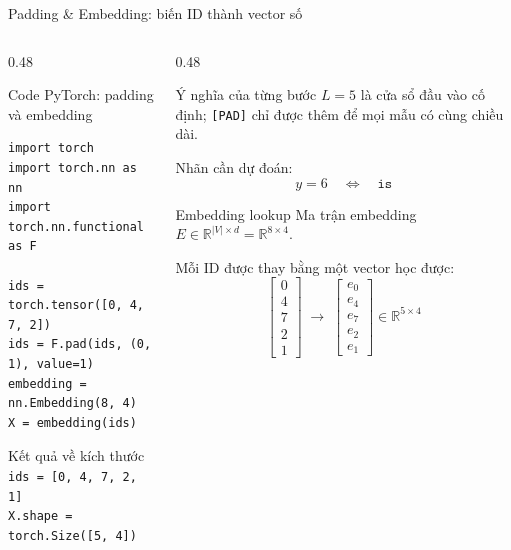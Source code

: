\documentclass[aspectratio=169, 10pt]{beamer}
\begin{document}
\begin{frame}[fragile]{Padding \& Embedding: biến ID thành vector số}
\begin{columns}[T]
\begin{column}{0.48\textwidth}
\begin{block}{Code PyTorch: padding và embedding}
\begin{lstlisting}[style=rnnpython]
import torch
import torch.nn as nn
import torch.nn.functional as F

ids = torch.tensor([0, 4, 7, 2])
ids = F.pad(ids, (0, 1), value=1)
embedding = nn.Embedding(8, 4)
X = embedding(ids)
\end{lstlisting}
\end{block}

\begin{exampleblock}{Kết quả về kích thước}
\scriptsize
\texttt{ids = [0, 4, 7, 2, 1]}\\
\texttt{X.shape = torch.Size([5, 4])}
\end{exampleblock}
\end{column}

\begin{column}{0.48\textwidth}
\begin{block}{Ý nghĩa của từng bước}
\(L=5\) là cửa sổ đầu vào cố định; \texttt{[PAD]} chỉ được thêm để mọi mẫu có cùng chiều dài.

Nhãn cần dự đoán:
\[
y=6 \quad\Longleftrightarrow\quad \texttt{is}
\]
\end{block}

\begin{exampleblock}{Embedding lookup}
\scriptsize
Ma trận embedding \(E\in\mathbb{R}^{|V|\times d}=\mathbb{R}^{8\times4}\).

Mỗi ID được thay bằng một vector học được:
\[
\begin{bmatrix}
0\\4\\7\\2\\1
\end{bmatrix}
\;\longrightarrow\;
\begin{bmatrix}
e_0\\e_4\\e_7\\e_2\\e_1
\end{bmatrix}
\in\mathbb{R}^{5\times 4}
\]
\end{exampleblock}
\end{column}
\end{columns}
\end{frame}
\end{document}
